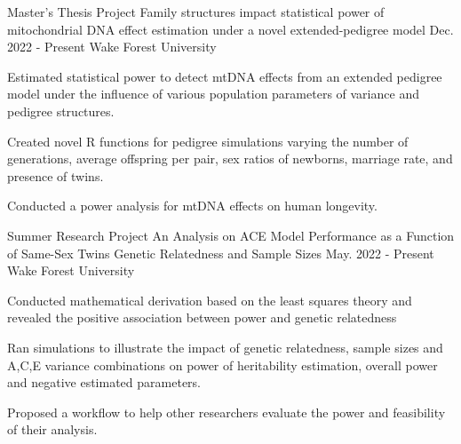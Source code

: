 
\begin{cventries}



    \cventry
    {Master's Thesis Project} %
    {Family structures impact statistical power of mitochondrial DNA effect estimation under a novel extended-pedigree model} %
    {Dec. 2022 - Present} %
    {Wake Forest University} %
    {
      \begin{cvitems} %
        \item {Estimated statistical power to detect mtDNA effects from an extended pedigree model under the influence of various population parameters of variance and pedigree structures.}
        \item {Created novel R functions for pedigree simulations varying the number of generations, average offspring per pair, sex ratios of newborns, marriage rate, and presence of twins. }
        \item {Conducted a power analysis for mtDNA effects on human longevity.}
      \end{cvitems}
    }

    \cventry
    {Summer Research Project} %
    {An Analysis on ACE Model Performance as a Function of Same-Sex Twins Genetic Relatedness and Sample Sizes } %
    {May. 2022 - Present} %
    {Wake Forest University} %
    {
      \begin{cvitems} %
        \item {Conducted mathematical derivation based on the least squares theory and revealed the positive association between power and genetic relatedness}
        \item {Ran simulations to illustrate the impact of genetic relatedness, sample sizes and A,C,E variance combinations on  power of heritability estimation, overall power and negative estimated parameters.}
        \item {Proposed a workflow to help other researchers evaluate the power and feasibility of their analysis. }
      \end{cvitems}
    }
    

\end{cventries}
